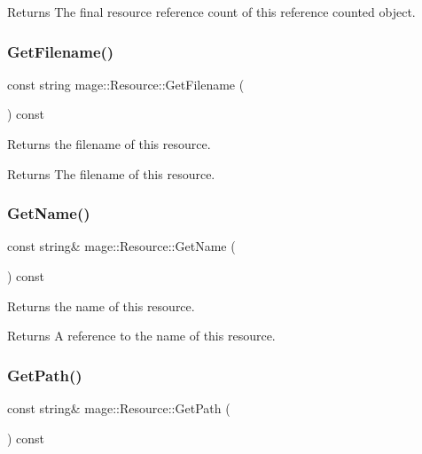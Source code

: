 \begin{DoxyReturn}{Returns}
The final resource reference count of this reference counted object. 
\end{DoxyReturn}
\hypertarget{classmage_1_1_resource_a3235bf2744390d5957b9b4038e4bb512}{}\label{classmage_1_1_resource_a3235bf2744390d5957b9b4038e4bb512} 
\subsubsection{\texorpdfstring{Get\+Filename()}{GetFilename()}}
{\footnotesize\ttfamily const string mage\+::\+Resource\+::\+Get\+Filename (\begin{DoxyParamCaption}{ }\end{DoxyParamCaption}) const}

Returns the filename of this resource.

\begin{DoxyReturn}{Returns}
The filename of this resource. 
\end{DoxyReturn}
\hypertarget{classmage_1_1_resource_a77713b0c74f8983afc2d42843afe8cbe}{}\label{classmage_1_1_resource_a77713b0c74f8983afc2d42843afe8cbe} 
\subsubsection{\texorpdfstring{Get\+Name()}{GetName()}}
{\footnotesize\ttfamily const string\& mage\+::\+Resource\+::\+Get\+Name (\begin{DoxyParamCaption}{ }\end{DoxyParamCaption}) const}

Returns the name of this resource.

\begin{DoxyReturn}{Returns}
A reference to the name of this resource. 
\end{DoxyReturn}
\hypertarget{classmage_1_1_resource_a2ef6c6937947b56cbabc569e3a63ca71}{}\label{classmage_1_1_resource_a2ef6c6937947b56cbabc569e3a63ca71} 
\subsubsection{\texorpdfstring{Get\+Path()}{GetPath()}}
{\footnotesize\ttfamily const string\& mage\+::\+Resource\+::\+Get\+Path (\begin{DoxyParamCaption}{ }\end{DoxyParamCaption}) const}

